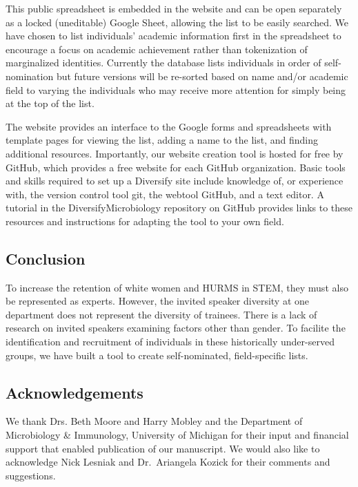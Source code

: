 \documentclass[10pt,]{article}
\begin{document}
This public spreadsheet is embedded in the website and can be open
separately as a locked (uneditable) Google Sheet, allowing the list to
be easily searched. We have chosen to list individuals' academic
information first in the spreadsheet to encourage a focus on academic
achievement rather than tokenization of marginalized identities.
Currently the database lists individuals in order of self-nomination but
future versions will be re-sorted based on name and/or academic field to
varying the individuals who may receive more attention for simply being
at the top of the list.

The website provides an interface to the Google forms and spreadsheets
with template pages for viewing the list, adding a name to the list, and
finding additional resources. Importantly, our website creation tool is
hosted for free by GitHub, which provides a free website for each GitHub
organization. Basic tools and skills required to set up a Diversify site
include knowledge of, or experience with, the version control tool git,
the webtool GitHub, and a text editor. A tutorial in the
DiversifyMicrobiology repository on GitHub provides links to these
resources and instructions for adapting the tool to your own field.

\subsection{Conclusion}\label{conclusion}

To increase the retention of white women and HURMS in STEM, they must
also be represented as experts. However, the invited speaker diversity
at one department does not represent the diversity of trainees. There is
a lack of research on invited speakers examining factors other than
gender. To facilite the identification and recruitment of individuals in
these historically under-served groups, we have built a tool to create
self-nominated, field-specific lists.

\subsection{Acknowledgements}\label{acknowledgements}

We thank Drs. Beth Moore and Harry Mobley and the Department of
Microbiology \& Immunology, University of Michigan for their input and
financial support that enabled publication of our manuscript. We would
also like to acknowledge Nick Lesniak and Dr.~Ariangela Kozick for their
comments and suggestions.
\end{document}
